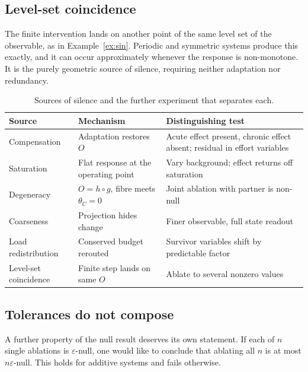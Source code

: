 \documentclass[11pt]{article}
\theoremstyle{definition}
\theoremstyle{remark}
\begin{document}
\subsection{Level-set coincidence}

The finite intervention lands on another point of the same level set of the observable, as in Example~\ref{ex:sin}. Periodic and symmetric systems produce this exactly, and it can occur approximately whenever the response is non-monotone. It is the purely geometric source of silence, requiring neither adaptation nor redundancy.

\begin{table}[h]
\centering
\small
\begin{tabular}{p{2.7cm}p{4.0cm}p{5.4cm}}
\toprule
Source & Mechanism & Distinguishing test\\
\midrule
Compensation & Adaptation restores $O$ & Acute effect present, chronic effect absent; residual in effort variables\\
Saturation & Flat response at the operating point & Vary background; effect returns off saturation\\
Degeneracy & $O=h\circ g$, fibre meets $\theta_C=0$ & Joint ablation with partner is non-null\\
Coarseness & Projection hides change & Finer observable, full state readout\\
Load redistribution & Conserved budget rerouted & Survivor variables shift by predictable factor\\
Level-set coincidence & Finite step lands on same $O$ & Ablate to several nonzero values\\
\bottomrule
\end{tabular}
\caption{Sources of silence and the further experiment that separates each.}
\end{table}

\subsection{Tolerances do not compose}

A further property of the null result deserves its own statement. If each of $n$ single ablations is $\varepsilon$-null, one would like to conclude that ablating all $n$ is at most $n\varepsilon$-null. This holds for additive systems and fails otherwise.
\end{document}
